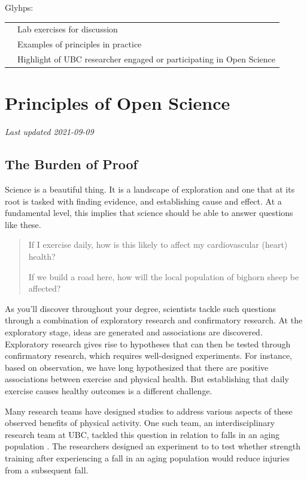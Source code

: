 \documentclass[
]{book}
\begin{document}
Glyhps:

\begin{longtable}[]{@{}ll@{}}
\toprule
\endhead
& Lab exercises for discussion \\
& Examples of principles in practice \\
& Highlight of UBC researcher engaged or participating in Open Science \\
\bottomrule
\end{longtable}

\hypertarget{principles-of-open-science}{%
\chapter{Principles of Open Science}\label{principles-of-open-science}}

\emph{Last updated 2021-09-09}

\hypertarget{the-burden-of-proof}{%
\section{The Burden of Proof}\label{the-burden-of-proof}}

Science is a beautiful thing. It is a landscape of exploration and one that at its root is tasked with finding evidence, and establishing cause and effect. At a fundamental level, this implies that science should be able to answer questions like these.

\begin{quote}
If I exercise daily, how is this likely to affect my cardiovascular (heart) health?

If we build a road here, how will the local population of bighorn sheep be affected?
\end{quote}

As you'll discover throughout your degree, scientists tackle such questions through a combination of exploratory research and confirmatory research. At the exploratory stage, ideas are generated and associations are discovered. Exploratory research gives rise to hypotheses that can then be tested through confirmatory research, which requires well-designed experiments. For instance, based on observation, we have long hypothesized that there are positive associations between exercise and physical health. But establishing that daily exercise causes healthy outcomes is a different challenge.

Many research teams have designed studies to address various aspects of these observed benefits of physical activity. One such team, an interdisciplinary research team at UBC, tackled this question in relation to falls in an aging population \citep{liu-ambrose_effect_2019}. The researchers designed an experiment to to test whether strength training after experiencing a fall in an aging population would reduce injuries from a subsequent fall.
\end{document}
